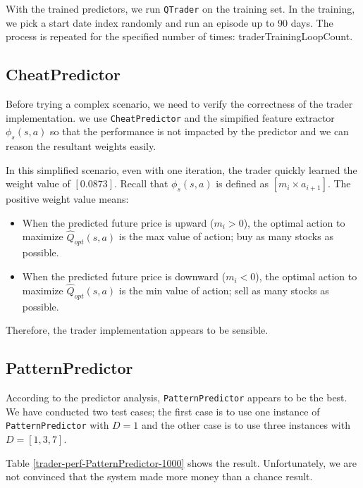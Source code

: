 \documentclass[twocolumn,10pt]{asme2ej}
\begin{document}
With the trained predictors, we run \verb|QTrader| on the training set. In the
training, we pick a start date index randomly and run an episode up to 90
days. The process is repeated for the specified number of times:
traderTrainingLoopCount.

\subsection{CheatPredictor}

Before trying a complex scenario, we need to verify the correctness of the
trader implementation. we use \verb|CheatPredictor| and the simpified feature
extractor $\phi_s(s,a)$ so that the performance is not impacted by the predictor
and we can reason the resultant weights easily.

In this simplified scenario, even with one iteration, the trader quickly learned
the weight value of $[0.0873]$. Recall that $\phi_s(s,a)$ is defined as $[m_i
  \times a_{i+1}]$. The positive weight value means:

\begin{itemize}
  \item When the predicted future price is upward ($m_i > 0$), the optimal
    action to maximize $\hat{Q}_{opt}(s, a)$ is the max value of action; buy as
    many stocks as possible.

  \item When the predicted future price is downward ($m_i < 0$), the optimal
    action to maximize $\hat{Q}_{opt}(s, a)$ is the min value of action; sell as
    many stocks as possible.
\end{itemize}

Therefore, the trader implementation appears to be sensible.

\subsection{PatternPredictor}

According to the predictor analysis, \verb|PatternPredictor| appears to be the
best. We have conducted two test cases; the first case is to use one instance of
\verb|PatternPredictor| with $D=1$ and the other case is to use three instances
with $D=[1, 3, 7]$.

Table \ref{trader-perf-PatternPredictor-1000} shows the result. Unfortunately,
we are not convinced that the system made more money than a chance result.
\end{document}
